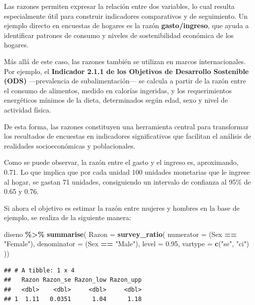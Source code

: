 \documentclass[
  12pt,
]{book}
\newenvironment{Shaded}{\begin{snugshade}}{\end{snugshade}}
\newcommand{\AttributeTok}[1]{\textcolor[rgb]{0.13,0.29,0.53}{#1}}
\newcommand{\FloatTok}[1]{\textcolor[rgb]{0.00,0.00,0.81}{#1}}
\newcommand{\FunctionTok}[1]{\textcolor[rgb]{0.13,0.29,0.53}{\textbf{#1}}}
\newcommand{\NormalTok}[1]{#1}
\newcommand{\SpecialCharTok}[1]{\textcolor[rgb]{0.81,0.36,0.00}{\textbf{#1}}}
\newcommand{\StringTok}[1]{\textcolor[rgb]{0.31,0.60,0.02}{#1}}
\begin{document}
Las razones permiten expresar la relación entre dos variables, lo cual resulta especialmente útil para construir indicadores comparativos y de seguimiento. Un ejemplo directo en encuestas de hogares es la razón \textbf{gasto/ingreso}, que ayuda a identificar patrones de consumo y niveles de sostenibilidad económica de los hogares.

Más allá de este caso, las razones también se utilizan en marcos internacionales. Por ejemplo, el \textbf{Indicador 2.1.1 de los Objetivos de Desarrollo Sostenible (ODS)} ---prevalencia de subalimentación--- se calcula a partir de la razón entre el consumo de alimentos, medido en calorías ingeridas, y los requerimientos energéticos mínimos de la dieta, determinados según edad, sexo y nivel de actividad física.

De esta forma, las razones constituyen una herramienta central para transformar los resultados de encuestas en indicadores significativos que facilitan el análisis de realidades socioeconómicas y poblacionales.

Como se puede observar, la razón entre el gasto y el ingreso es, aproximando, 0.71. Lo que implica que por cada unidad 100 unidades monetarias que le ingrese al hogar, se gastan 71 unidades, consiguiendo un intervalo de confianza al 95\% de 0.65 y 0.76.

Si ahora el objetivo es estimar la razón entre mujeres y hombres en la base de ejemplo, se realiza de la siguiente manera:

\begin{Shaded}
\begin{Highlighting}[]
\NormalTok{diseno }\SpecialCharTok{\%\textgreater{}\%} \FunctionTok{summarise}\NormalTok{(}
    \AttributeTok{Razon =}  \FunctionTok{survey\_ratio}\NormalTok{(}
      \AttributeTok{numerator =}\NormalTok{ (Sex }\SpecialCharTok{==} \StringTok{"Female"}\NormalTok{),}
      \AttributeTok{denominator =}\NormalTok{ (Sex }\SpecialCharTok{==} \StringTok{"Male"}\NormalTok{),}
      \AttributeTok{level =} \FloatTok{0.95}\NormalTok{,}
    \AttributeTok{vartype =}  \FunctionTok{c}\NormalTok{(}\StringTok{"se"}\NormalTok{, }\StringTok{"ci"}\NormalTok{)}
\NormalTok{    ))}
\end{Highlighting}
\end{Shaded}

\begin{verbatim}
## # A tibble: 1 x 4
##   Razon Razon_se Razon_low Razon_upp
##   <dbl>    <dbl>     <dbl>     <dbl>
## 1  1.11   0.0351      1.04      1.18
\end{verbatim}
\end{document}
